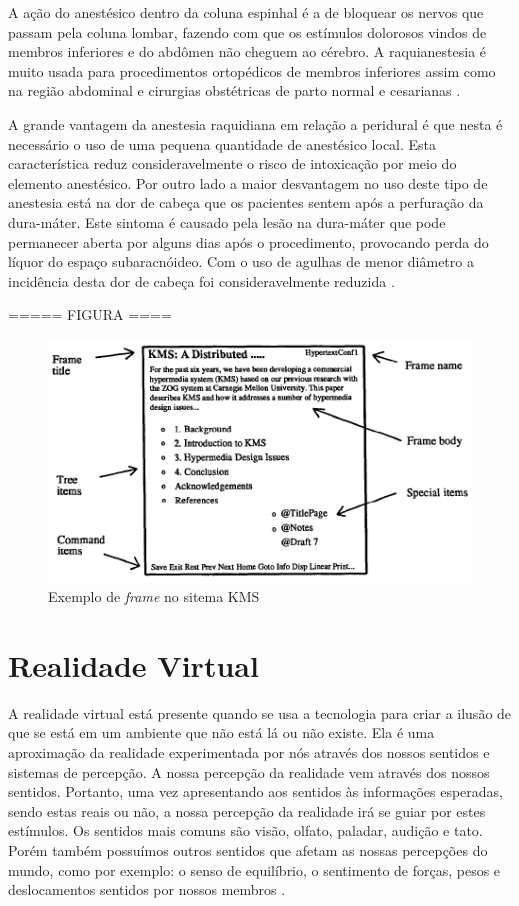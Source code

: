 A ação do anestésico dentro da coluna espinhal é a de bloquear os nervos que passam pela coluna lombar, fazendo com que os estímulos dolorosos vindos de membros inferiores e do abdômen não cheguem ao cérebro. A raquianestesia é muito usada para procedimentos ortopédicos de membros inferiores assim como na região abdominal e cirurgias obstétricas de parto normal e cesarianas \cite{Pinheiro2018}.

A grande vantagem da anestesia raquidiana em relação a peridural é que nesta é necessário o uso de uma pequena quantidade de anestésico local. Esta característica reduz consideravelmente o risco de intoxicação por meio do elemento anestésico. Por outro lado a maior desvantagem no uso deste tipo de anestesia está na dor de cabeça que os pacientes sentem após a perfuração da dura-máter. Este sintoma é causado pela lesão na dura-máter que pode permanecer aberta por alguns dias após o procedimento, provocando perda do líquor do espaço subaracnóideo. Com o uso de agulhas de menor diâmetro a incidência desta dor de cabeça foi consideravelmente reduzida \cite{INFOESCOLA2018}. 

===== FIGURA ====

\begin{figure}[h!]
    \centering
    \includegraphics[scale=0.6,keepaspectratio=true]{figuras/FrameKMS.png}
    \caption{Exemplo de \textit{frame} no sitema KMS \cite{akscyn1987kms}}
    \label{fig:frameKMS}
\end{figure}

\section{Realidade Virtual}

A realidade virtual está presente quando se usa a tecnologia para criar a ilusão de que se está em um ambiente que não está lá ou não existe. Ela é uma aproximação da realidade experimentada por nós através dos nossos sentidos e sistemas de percepção. A nossa percepção da realidade vem através dos nossos sentidos. Portanto, uma vez apresentando aos sentidos às informações esperadas, sendo estas reais ou não, a nossa percepção da realidade irá se guiar por estes estímulos. Os sentidos mais comuns são visão, olfato, paladar, audição e tato. Porém também possuímos outros sentidos que afetam as nossas percepções do mundo, como por exemplo: o senso de equilíbrio, o sentimento de forças, pesos e deslocamentos sentidos por nossos membros \cite{VRS2018}.

